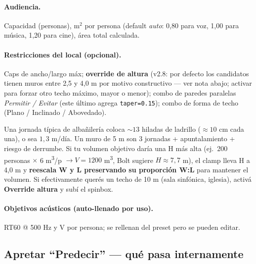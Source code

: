 \documentclass[11pt, a4paper]{article}
\newenvironment{nota}[1][Nota]{%
  \begin{tcolorbox}[mybox=cBlue, title={#1}]%
}{\end{tcolorbox}}
\newcommand{\menu}[1]{\textbf{\guillemotleft #1\guillemotright}}
\begin{document}
\paragraph{Audiencia.}
Capacidad (personas), $\mathrm{m}^{2}$ por persona (default \emph{auto}:
0,80 para voz, 1,00 para música, 1,20 para cine), área total calculada.

\paragraph{Restricciones del local (opcional).}
Caps de ancho/largo máx; \textbf{override de altura} (v2.8: por defecto los
candidatos tienen muros entre 2,5 y 4,0 m por motivo constructivo --- ver
nota abajo; activar para forzar otro techo máximo, mayor o menor); combo
de paredes paralelas \emph{Permitir / Evitar} (este último agrega
\texttt{taper=0.15}); combo de forma de techo (Plano / Inclinado /
Abovedado).

\begin{nota}[Por qué 2,5--4 m por defecto (v2.8)]
Una jornada típica de albañilería coloca $\sim 13$ hiladas de ladrillo
($\approx 10$ cm cada una), o sea $1{,}3$ m/día. Un muro de 5 m son 3
jornadas + apuntalamiento + riesgo de derrumbe. Si tu volumen objetivo
daría una H más alta (ej.\ 200 personas $\times$ 6 m\textsuperscript{3}/p
$\to V = 1200$ m\textsuperscript{3}, Bolt sugiere $H \approx 7{,}7$ m),
el clamp lleva H a 4,0 m y \textbf{reescala W y L preservando su
proporción W:L} para mantener el volumen. Si efectivamente querés un
techo de 10 m (sala sinfónica, iglesia), activá \menu{Override altura}
y subí el spinbox.
\end{nota}

\paragraph{Objetivos acústicos (auto-llenado por uso).}
RT60 @ 500 Hz y V por persona; se rellenan del preset pero se pueden
editar.

\subsection{Apretar ``Predecir'' --- qué pasa internamente}
\end{document}
